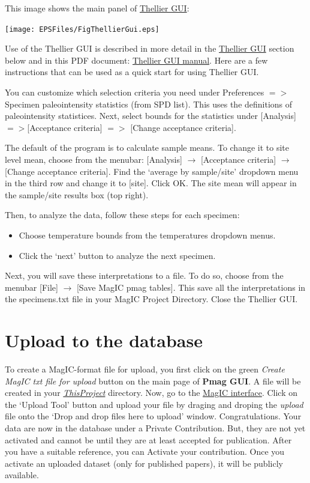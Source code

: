 \documentclass[11pt]{book}
\begin{document}
{{This image shows the main panel of \href{#ThellierGUI}{Thellier GUI}:

\texttt{[image: EPSFiles/FigThellierGui.eps]}

Use of the Thellier GUI is described in more detail in the \href{#thellier_GUI.py}{Thellier GUI} section below and in this PDF document: \href{https://github.com/PmagPy/PmagPy-Cookbook/blob/gh-pages/thellier_GUI_full_manual.pdf}{Thellier GUI manual}. Here are a few instructions that can be used as a quick start for using Thellier GUI.

You can customize which selection criteria you need  under Preferences $=>$ Specimen paleointensity statistics (from SPD list).  This uses the \cite{paterson14} definitions of paleointensity statistices.
Next, select bounds for the statistics under [Analysis] $=>$[Acceptance criteria] $=>$ [Change acceptance criteria].

The default of the program is to calculate sample means. To change it to site level mean, choose from the menubar: [Analysis] $\rightarrow$ [Acceptance criteria] $\rightarrow$  [Change acceptance criteria]. Find the `average by sample/site' dropdown menu in the third row and change it to [site]. Click OK. The site mean will appear in the sample/site results box (top right).

Then, to analyze the data, follow these steps for each specimen:
 \begin{itemize}
 \item Choose temperature bounds from the temperatures dropdown menus.
 \item  Click the ‘next’ button to analyze the next specimen.
   \end{itemize}
Next, you will save these interpretations to a file.  To do so, choose from the menubar [File] $\rightarrow$ [Save MagIC pmag tables]. This save all the interpretations in the specimens.txt file in your MagIC Project Directory.
Close the Thellier GUI.



\section{Upload to the database }

To create a MagIC-format file for upload, you first click on the green {\it Create MagIC txt file for upload} button on the main page of {\bf Pmag GUI}. A file will be created in your \href{#Project_Directory}{\it ThisProject} directory.  Now, go to the  \href{http://earthref.org/MAGIC/}{MagIC  interface}.      Click on the `Upload Tool' button and upload your file by  draging and droping the {\it upload}   file onto the  `Drop and drop files here to upload' window.
Congratulations. Your data are now in the database under a Private Contribution.  But, they are not yet activated and cannot be until they are at least accepted for publication.  After you have a suitable reference, you can Activate your contribution.  Once you activate an uploaded dataset (only for published papers), it will be publicly available.

}}
\end{document}
